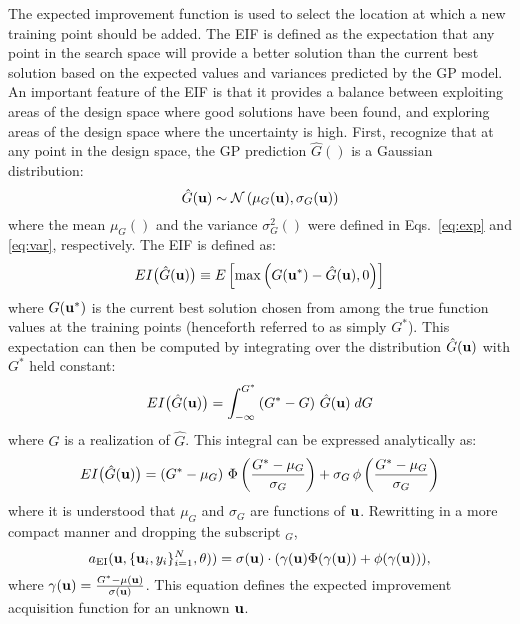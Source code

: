 The expected improvement function is used to select the location at which a 
new training point should be added.
The EIF is defined as the expectation that any point in the search
space will provide a better solution than the current best solution
based on the expected values and variances predicted by the GP model.
An important feature of the EIF is that it provides a balance between 
exploiting areas of the design space where good solutions have been found, and 
exploring areas of the design space where the uncertainty is high.
First, recognize that at any point in the design space, the GP prediction
$\hat{G}()$ is a Gaussian distribution:
\begin{equation}
\hat{G}({\bf u}) \sim \mathcal{N}\left( \mu_G({\bf u}), \sigma_G({\bf u}) \right)
\end{equation}
\noindent where the mean $\mu_G()$ and the variance $\sigma_G^2()$ were 
defined in Eqs.~\ref{eq:exp} and \ref{eq:var}, respectively.
The EIF is defined as:~\cite{Jon98}
\begin{equation}
EI\bigl( \hat{G}({\bf u}) \bigr) \equiv 
  E\left[ \max \left( G({\bf u}^*) - \hat{G}({\bf u}),0 \right) \right]  
\end{equation}
\noindent where $G({\bf u}^*)$ is the current best solution chosen from among 
the true function values at the training points (henceforth referred to as
simply $G^*$).
This expectation can then be computed by integrating over the distribution 
$\hat{G}({\bf u})$ with $G^*$ held constant:
\begin{equation}
EI\bigl( \hat{G}({\bf u}) \bigr) = 
  \int_{-\infty}^{G^*} \left( G^* - G \right) \, \hat{G}({\bf u}) \; dG  
  \label{eq:eif_int}
\end{equation}
\noindent where $G$ is a realization of $\hat{G}$.
This integral can be expressed analytically as:~\cite{Jon98}
\begin{equation}
EI\bigl( \hat{G}({\bf u}) \bigr) = \left( G^* - \mu_G \right) \,
  \Phi\left( \frac{G^* - \mu_G}{\sigma_G} \right) + \sigma_G \,
  \phi\left( \frac{G^* - \mu_G}{\sigma_G} \right) \label{eq:eif}
\end{equation}
\noindent where it is understood that $\mu_G$ and $\sigma_G$ are functions of 
${\bf u}$.
Rewritting in a more compact manner and dropping the subscript $_G$, 
\begin{equation}
\label{eq:eifShort}
a_\text{EI}({\bf u}, \{{\bf u}_i,y_i \}_{i=1}^N,\theta)) = \sigma({\bf u}) \cdot( \gamma({\bf u}) \Phi(\gamma({\bf u}) ) + \phi(\gamma({\bf u})) ),
\end{equation}
where $\gamma({\bf u}) = \frac{G^* - \mu({\bf u})}{\sigma({\bf u})}$. This equation defines the expected improvement acquisition function for an unknown ${\bf u}$. 

